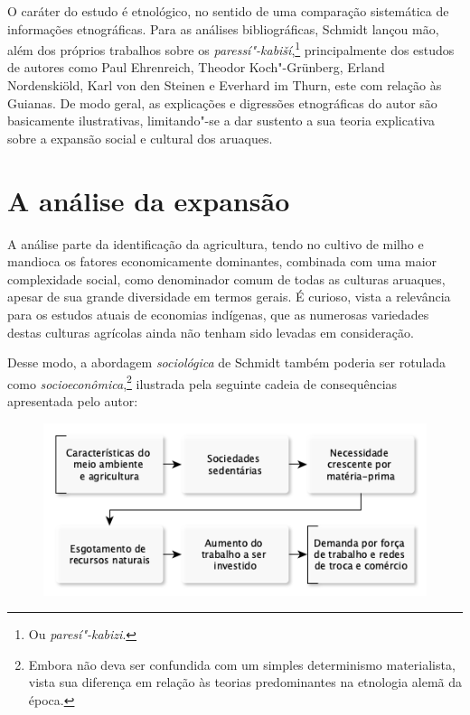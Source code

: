 O caráter do estudo é etnológico, no sentido de uma comparação sistemática de informações etnográficas. Para as análises bibliográficas, Schmidt lançou mão, além dos próprios trabalhos sobre os \textit{paressí"-kabiší},\footnote{Ou \textit{paresí"-kabizi}.} principalmente dos estudos de autores como Paul Ehrenreich, Theodor Koch"-Grünberg, Erland Nordenskiöld, Karl von den Steinen e Everhard im Thurn, este com relação às Guianas. De modo geral, as explicações e digressões etnográficas do autor são basicamente ilustrativas, limitando"-se a dar sustento a sua teoria explicativa sobre a expansão social e cultural dos aruaques.

\section{A análise da expansão}

A análise parte da identificação da agricultura, tendo no cultivo de milho e mandioca os fatores economicamente dominantes, combinada com uma maior complexidade social, como denominador comum de todas as culturas aruaques, apesar de sua grande diversidade em termos gerais. É curioso, vista a relevância para os estudos atuais de economias indígenas, que as numerosas variedades destas culturas agrícolas ainda não tenham sido levadas em consideração.

Desse modo, a abordagem \textit{sociológica} de Schmidt também poderia ser
rotulada como \textit{socioeconômica},\footnote{Embora não deva ser confundida com um
simples determinismo materialista, vista sua diferença em relação às teorias
predominantes na etnologia alemã da época.} ilustrada pela seguinte cadeia de 
consequências apresentada pelo autor:
\medskip

\begin{figure}[H]
  \includegraphics[width=\textwidth]{./TABELA.png}  
\end{figure}

